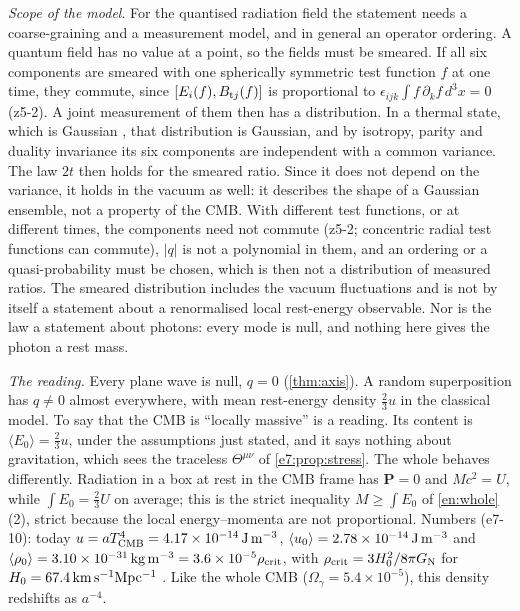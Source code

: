 \emph{Scope of the model}. For the quantised radiation field the statement needs a coarse-graining and a measurement model, and in
general an operator ordering. A quantum field has no value at a point, so the fields must be smeared. If all six components are smeared with
one spherically symmetric test function $f$ at one time, they commute, since $[E_i(f),B_{{\rm t}j}(f)]$ is proportional to
$\epsilon_{ijk}\int f\,\partial_kf\,d^3x=0$ (z5-2). A joint measurement of them then has a distribution. In a thermal state, which is Gaussian
\cite{Glauber63}, that distribution is Gaussian, and by isotropy, parity and duality invariance its six components are independent with a
common variance. The law $2t$ then holds for the smeared ratio. Since it does not depend on the variance, it holds in the vacuum as well: it
describes the shape of a Gaussian ensemble, not a property of the CMB. With different test functions, or at different times, the components need
not commute (z5-2; concentric radial test functions can commute), $|q|$ is not a polynomial in them, and an ordering or a quasi-probability must be
chosen, which is then not a distribution of measured ratios. The smeared distribution includes the vacuum fluctuations and is not by itself a
statement about a renormalised local rest-energy observable. Nor is the law a statement about photons: every mode is null, and nothing here gives the photon a rest mass.

\emph{The reading.} Every plane wave is null, $q=0$ (\cref{thm:axis}). A random superposition has $q\neq0$ almost everywhere, with
mean rest-energy density $\tfrac23u$ in the classical model. To say that the CMB is ``locally massive'' is a reading. Its content is
$\langle E_0\rangle=\tfrac23u$, under the assumptions just stated, and it says nothing about gravitation, which sees the traceless $\Theta^{\mu\nu}$ of \cref{e7:prop:stress}. The whole behaves differently. Radiation in a box at
rest in the CMB frame has $\mathbf P=0$ and $Mc^2=U$, while $\int E_0=\tfrac23U$ on average; this is the strict inequality $M\ge\int E_0$ of
\cref{en:whole}(2), strict because the local energy--momenta are not proportional. Numbers (e7-10): today
$u=aT_{\rm CMB}^4=4.17\times10^{-14}\,{\rm J\,m^{-3}}$, $\langle u_0\rangle=2.78\times10^{-14}\,{\rm J\,m^{-3}}$ and
$\langle\rho_0\rangle=3.10\times10^{-31}\,{\rm kg\,m^{-3}}=3.6\times10^{-5}\rho_{\rm crit}$, with $\rho_{\rm crit}=3H_0^2/8\pi G_{\rm N}$ for
$H_0=67.4\,{\rm km\,s^{-1}Mpc^{-1}}$ \cite{Planck18VI}. Like the whole CMB ($\Omega_\gamma=5.4\times10^{-5}$), this density redshifts as $a^{-4}$.

